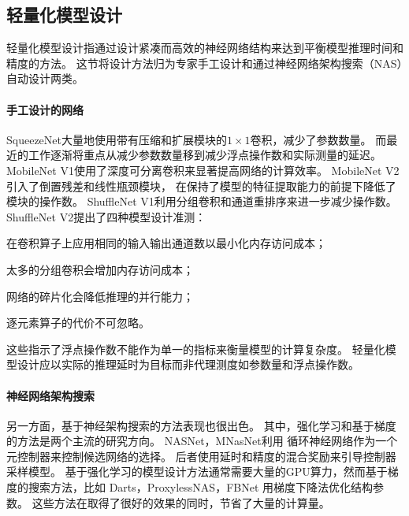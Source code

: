 \subsection{轻量化模型设计}
轻量化模型设计指通过设计紧凑而高效的神经网络结构来达到平衡模型推理时间和精度的方法。
这节将设计方法归为专家手工设计和通过神经网络架构搜索（NAS）自动设计两类。

\paragraph{手工设计的网络}
SqueezeNet\cite{iandola2016squeezenet}大量地使用带有压缩和扩展模块的$1\times 1$卷积，减少了参数数量。
而最近的工作逐渐将重点从减少参数数量移到减少浮点操作数和实际测量的延迟。
MobileNet V1\cite{howard2017mobilenets}使用了深度可分离卷积来显著提高网络的计算效率。
MobileNet V2\cite{sandler2018mobilenetv2}引入了倒置残差和线性瓶颈模块，
在保持了模型的特征提取能力的前提下降低了模块的操作数。
ShuffleNet V1\cite{zhang2018shufflenet}利用分组卷积和通道重排序来进一步减少操作数。
ShuffleNet V2\cite{ma2018shufflenet}提出了四种模型设计准测：
\begin{enumerate*}
    \item 在卷积算子上应用相同的输入输出通道数以最小化内存访问成本；
    \item 太多的分组卷积会增加内存访问成本；
    \item 网络的碎片化会降低推理的并行能力；
    \item 逐元素算子的代价不可忽略。
\end{enumerate*}
这些指示了浮点操作数不能作为单一的指标来衡量模型的计算复杂度。
轻量化模型设计应以实际的推理延时为目标而非代理测度如参数量和浮点操作数。

\paragraph{神经网络架构搜索}
另一方面，基于神经架构搜索的方法表现也很出色。
其中，强化学习和基于梯度的方法是两个主流的研究方向。
NASNet\cite{zoph2018learning}，MNasNet\cite{tan2019mnasnet}利用
循环神经网络作为一个元控制器来控制候选网络的选择。
后者使用延时和精度的混合奖励来引导控制器采样模型。
基于强化学习的模型设计方法通常需要大量的GPU算力，然而基于梯度的搜索方法，比如
Darts\cite{liu2018darts}，ProxylessNAS\cite{cai2018proxylessnas}，FBNet\cite{wu2019fbnet}
用梯度下降法优化结构参数。
这些方法在取得了很好的效果的同时，节省了大量的计算量。